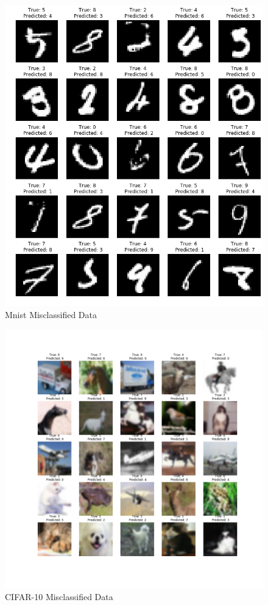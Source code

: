 \documentclass[11pt]{article}
\begin{document}
\begin{figure}[!]
  \includegraphics[width=\linewidth]{./Project_1_files/Project_1_77_0.png}
  \caption{Mnist Misclassified Data}
  \label{fig:miss}
\end{figure}

\begin{figure}[!]
  \includegraphics[width=\linewidth]{./Project_1_files/cifar_misclassified.png}
  \caption{CIFAR-10 Misclassified Data}
  \label{fig:cifar}
\end{figure}
\end{document}
